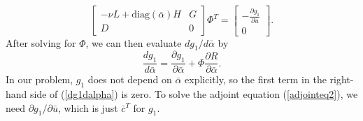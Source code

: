 \begin{equation}
\label{adjointeq2}
  \left[\begin{matrix}
     -\nu L + \text{diag}(\bar{\alpha})H   & G\\
     D               &  0
   \end{matrix} \right] \Phi^T =
  \left[\begin{matrix}
    -\frac{\partial{g_1}}{\partial{\bar{u}}}\\
    0
   \end{matrix} \right].
\end{equation}
After solving for $\Phi$, we can then evaluate $dg_1/d\bar{\alpha}$ by
\begin{equation}
\label{dg1dalpha}
  \frac{dg_1}{d\bar{\alpha}}  =  \frac{\partial{g_1}}{\partial{\bar{\alpha}}}+\Phi \frac{\partial{R}}{\partial{\bar{\alpha}}}.
\end{equation}
In our problem, $g_1$ does not depend on $\bar{\alpha}$ explicitly, so
the first term in the right-hand side of (\ref{dg1dalpha}) is zero. To
solve the adjoint equation (\ref{adjointeq2}), we need
$\partial{g_1}/\partial{\bar{u}}$, which is just $\bar{c}^T$ for
$g_1$.
